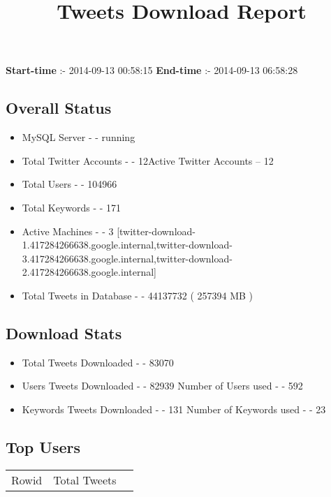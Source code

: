 \documentclass{article}\usepackage[T1]{fontenc}
\begin{document}
\title{\textbf{Tweets Download Report}}
               \date{}
                \maketitle
               \centerline{\textbf{Start-time} :- 2014-09-13 00:58:15 \hspace{40pt} \textbf{End-time} :- 2014-09-13 06:58:28}               \subsection*{Overall Status}                \begin{itemize}                \item MySQL Server - - running               \item Total Twitter Accounts - - 12\newline Active Twitter Accounts -- 12               \item Total Users - - 104966               \item Total Keywords - - 171               \item Active Machines - - 3 [twitter-download-1.417284266638.google.internal,twitter-download-3.417284266638.google.internal,twitter-download-2.417284266638.google.internal]               \item Total Tweets in Database - - 44137732 ( 257394 MB )               \end{itemize}               \subsection*{Download Stats}                \begin{itemize}                \item Total Tweets Downloaded - - 83070               \item Users Tweets Downloaded - - 82939 \newline Number of Users used - - 592               \item Keywords Tweets Downloaded - - 131 \newline Number of Keywords used - - 23              \end{itemize}              \subsection*{Top Users}\begin{tabular}{|c|c|c|}         \hline         Rowid & Total Tweets \\ 

\end{tabular}
\end{document}
